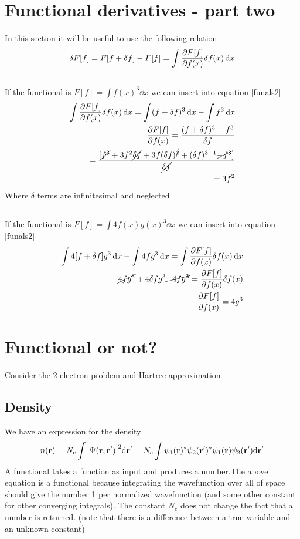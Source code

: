 \documentclass{article}
\begin{document}
	\newpage
	\section{Functional derivatives - part two}
	In this section it will be useful to use the following relation
	\begin{equation}\label{funals2}
		\delta F[f] = F[f+\delta f]-F[f] = \int\pdv{F[f]}{f(x)}\delta f(x)\dd{x}
	\end{equation}
	\subsection{}
	If the functional is $F[f] = \int f(x)^3\dd{x}$ we can insert into equation \ref{funals2}
	\begin{align*}
		\int\pdv{F[f]}{f(x)}\delta f(x)\dd{x} = \int (f+\delta f)^3\dd{x} - \int f^3 \dd{x}\\
		\pdv{F[f]}{f(x)} = \frac{(f+\delta f)^3 - f^3}{\delta f}\\
		= \frac{[\cancel{f^3} + 3f^2\cancel{\delta f} + 3f(\delta f)^{\cancel{2}} + (\delta f)^{3-1} \cancel{- f^3}]}{\cancel{\delta f}}\\
		= 3f^2
	\end{align*}
	Where $\delta $ terms are infinitesimal and neglected
	\subsection{}
	If the functional is $F[f] = \int 4f(x)g(x)^3\dd{x}$ we can insert into equation \ref{funals2}
	\begin{align*}
		\int 4[f+\delta f]g^3\dd{x}-\int 4fg^3\dd{x} = \int\pdv{F[f]}{f(x)}\delta f(x)\dd{x}\\
		\cancel{4fg^3}+4\delta fg^3 \cancel{- 4fg^3} = \pdv{F[f]}{f(x)}\delta f(x)\\
		\pdv{F[f]}{f(x)} = 4g^3
	\end{align*}
	
	\section{Functional or not?}
		Consider the 2-electron problem and Hartree approximation
	\subsection{Density}
		We have an expression for the density
		\begin{align*}
			n(\vb{r})=N_e \int \abs{\Psi(\vb{r},\vb{r}')}^2\dd\vb{r}'=N_e \int \psi_1(\vb{r})^* \psi_2(\vb{r}' )^* \psi_1(\vb{r})\psi_2(\vb{r}')\dd \vb{r}'
		\end{align*}
		A functional takes a function as input and produces a number.The above equation is a functional because integrating the wavefunction over all of space should give the number 1 per normalized wavefunction (and some other constant for other converging integrals). The constant $N_e$ does not change the fact that a number is returned. (note that there is a difference between a true variable and an unknown constant)
\end{document}
